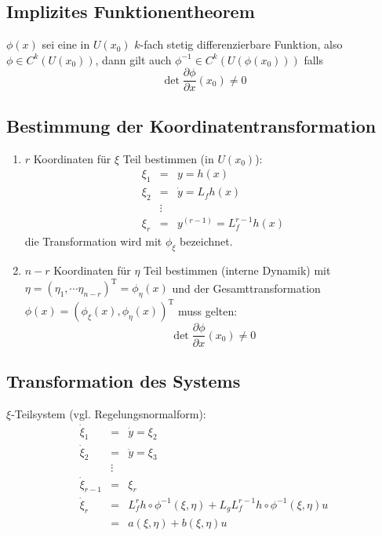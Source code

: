 \subsection{Implizites Funktionentheorem}
$\phi(x)$ sei eine in $U(x_0)$ $k$-fach stetig differenzierbare Funktion, also
$\phi \in C^k(U(x_0))$, dann gilt auch $\phi^{-1} \in C^k(U(\phi(x_0)))$ falls
\begin{equation}
    \det \frac{\partial \phi}{\partial x}(x_0) \neq 0
\end{equation}

\subsection{Bestimmung der Koordinatentransformation}
\begin{enumerate}
    \item
        $r$ Koordinaten für $\xi$ Teil bestimmen (in $U(x_0)$):
        \begin{eqnarray}
            \xi_1 &=& y = h(x) \\
            \xi_2 &=& \dot{y} = L_f h(x) \\
            &\vdots& \\
            \xi_r &=& y^{(r-1)} = L_f^{r-1} h(x)
        \end{eqnarray} 
        die Transformation wird mit $\phi_\xi$ bezeichnet.
    \item
        $n-r$ Koordinaten für $\eta$ Teil bestimmen (interne Dynamik) mit
        $\eta = {(\eta_1, \cdots \eta_{n-r})}^\text{T} = \phi_\eta(x)$ und der
        Gesamttransformation $\phi(x) = {(\phi_\xi(x), \phi_\eta(x))}^\text{T}$
        muss gelten:
        \begin{equation}
            \det \frac{\partial \phi}{\partial x}(x_0) \neq 0
        \end{equation}
\end{enumerate}

\subsection{Transformation des Systems}
$\xi$-Teilsystem (vgl. Regelungsnormalform):
\begin{eqnarray}
    \dot{\xi}_1 &=& \dot{y} = \xi_2 \\
    \dot{\xi}_2 &=& \ddot{y} = \xi_3 \\
        &\vdots& \\
    \dot{\xi}_{r-1} &=& \xi_r \\
    \dot{\xi}_r &=& L_f^r h \circ \phi^{-1}(\xi, \eta) + L_g L_f^{r-1} h \circ \phi^{-1}(\xi, \eta) u \\
        &=& a(\xi, \eta) + b(\xi, \eta) u
\end{eqnarray}

